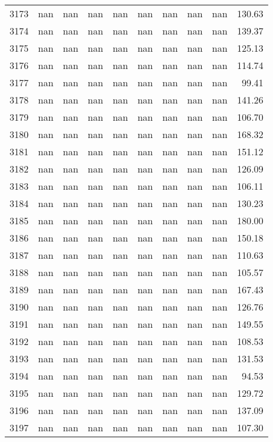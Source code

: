 \begin{tabular}{lrrrrrrrrr}
3173 & nan & nan & nan & nan & nan & nan & nan & nan & 130.63 \\
3174 & nan & nan & nan & nan & nan & nan & nan & nan & 139.37 \\
3175 & nan & nan & nan & nan & nan & nan & nan & nan & 125.13 \\
3176 & nan & nan & nan & nan & nan & nan & nan & nan & 114.74 \\
3177 & nan & nan & nan & nan & nan & nan & nan & nan & 99.41 \\
3178 & nan & nan & nan & nan & nan & nan & nan & nan & 141.26 \\
3179 & nan & nan & nan & nan & nan & nan & nan & nan & 106.70 \\
3180 & nan & nan & nan & nan & nan & nan & nan & nan & 168.32 \\
3181 & nan & nan & nan & nan & nan & nan & nan & nan & 151.12 \\
3182 & nan & nan & nan & nan & nan & nan & nan & nan & 126.09 \\
3183 & nan & nan & nan & nan & nan & nan & nan & nan & 106.11 \\
3184 & nan & nan & nan & nan & nan & nan & nan & nan & 130.23 \\
3185 & nan & nan & nan & nan & nan & nan & nan & nan & 180.00 \\
3186 & nan & nan & nan & nan & nan & nan & nan & nan & 150.18 \\
3187 & nan & nan & nan & nan & nan & nan & nan & nan & 110.63 \\
3188 & nan & nan & nan & nan & nan & nan & nan & nan & 105.57 \\
3189 & nan & nan & nan & nan & nan & nan & nan & nan & 167.43 \\
3190 & nan & nan & nan & nan & nan & nan & nan & nan & 126.76 \\
3191 & nan & nan & nan & nan & nan & nan & nan & nan & 149.55 \\
3192 & nan & nan & nan & nan & nan & nan & nan & nan & 108.53 \\
3193 & nan & nan & nan & nan & nan & nan & nan & nan & 131.53 \\
3194 & nan & nan & nan & nan & nan & nan & nan & nan & 94.53 \\
3195 & nan & nan & nan & nan & nan & nan & nan & nan & 129.72 \\
3196 & nan & nan & nan & nan & nan & nan & nan & nan & 137.09 \\
3197 & nan & nan & nan & nan & nan & nan & nan & nan & 107.30 \\

\end{tabular}
